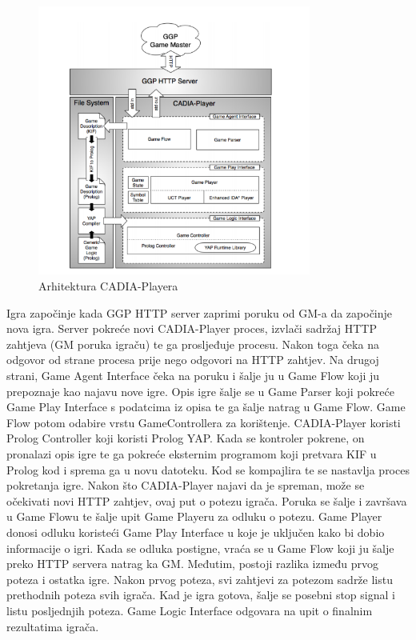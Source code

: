 \documentclass[a4paper,12pt]{foi}
\begin{document}
\begin{figure}[h]
\centering 
\includegraphics[width=0.80\textwidth]{cadia.png}
\caption{Arhitektura CADIA-Playera \citep{FinnsonH2007}}
\label{slika-3}
\end{figure}

Igra započinje kada GGP HTTP server zaprimi poruku od GM-a da započinje nova igra. Server pokreće novi CADIA-Player proces, izvlači sadržaj HTTP zahtjeva (GM poruka igraču) te ga prosljeđuje procesu. Nakon toga čeka na odgovor od strane procesa prije nego odgovori na HTTP zahtjev. Na drugoj strani, Game Agent Interface čeka na poruku i šalje ju u Game Flow koji ju prepoznaje kao najavu nove igre. Opis igre šalje se u Game Parser koji pokreće Game Play Interface s podatcima iz opisa te ga šalje natrag u Game Flow. Game Flow potom odabire vrstu GameControllera za korištenje. CADIA-Player koristi Prolog Controller  koji koristi Prolog YAP.  Kada se kontroler pokrene, on pronalazi opis igre te ga pokreće eksternim programom koji pretvara KIF u Prolog kod i sprema ga u novu datoteku. Kod se kompajlira te se nastavlja proces pokretanja igre.
Nakon što CADIA-Player najavi da je spreman, može se očekivati novi HTTP zahtjev, ovaj put o potezu igrača. Poruka se šalje i završava  u Game Flowu te šalje upit Game Playeru za odluku o potezu. Game Player donosi odluku koristeći Game Play Interface u koje je uključen kako bi dobio informacije o igri. Kada se odluka postigne, vraća se u Game Flow koji ju šalje  preko HTTP servera natrag ka GM.
Međutim, postoji razlika između prvog poteza i ostatka igre. Nakon prvog poteza, svi zahtjevi za potezom sadrže listu prethodnih poteza svih igrača. Kad je igra gotova, šalje se posebni stop signal i listu posljednjih poteza. Game Logic Interface odgovara na upit o finalnim rezultatima igrača. \citep{FinnsonH2007}
\end{document}
